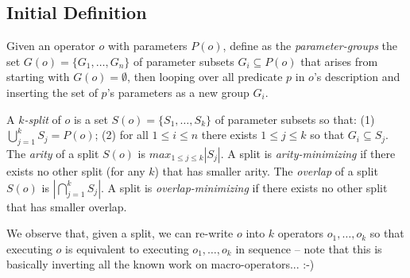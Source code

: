 

\subsection{Initial Definition}
\label{initial-definition}





Given an operator $o$ with parameters $P(o)$, define as the
\emph{parameter-groups} the set $G(o) = \{G_1, \dots, G_n\}$ of
parameter subsets $G_i \subseteq P(o)$ that arises from starting with
$G(o) = \emptyset$, then looping over all predicate $p$ in $o$'s
description and inserting the set of $p$'s parameters as a new group
$G_i$.


A \emph{$k$-split} of $o$ is a set $S(o) = \{S_1, \dots, S_k\}$ of
parameter subsets so that: (1) $\bigcup_{j=1}^k S_j = P(o)$; (2) for
all $1 \leq i \leq n$ there exists $1 \leq j \leq k$ so that $G_i
\subseteq S_j$. The \emph{arity} of a split $S(o)$ is $max_{1\leq j
  \leq k} |S_j|$. A split is \emph{arity-minimizing} if there exists
no other split (for any $k$) that has smaller arity. The
\emph{overlap} of a split $S(o)$ is $|\bigcap_{j=1}^k S_j|$. A split
is \emph{overlap-minimizing} if there exists no other split that has
smaller overlap.


We observe that, given a split, we can re-write $o$ into $k$ operators
$o_1, \dots, o_k$ so that executing $o$ is equivalent to executing
$o_1, \dots, o_k$ in sequence -- note that this is basically inverting
all the known work on macro-operators... :-)



